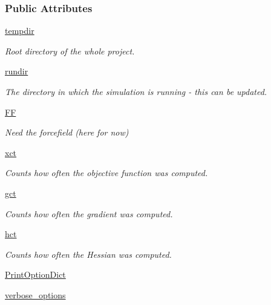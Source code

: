 \subsubsection*{\-Public \-Attributes}
\begin{DoxyCompactItemize}
\item 
\hyperlink{classforcebalance_1_1target_1_1Target_aede2856573b890cd47054ad36937d6f6}{tempdir}
\begin{DoxyCompactList}\small\item\em \-Root directory of the whole project. \end{DoxyCompactList}\item 
\hyperlink{classforcebalance_1_1target_1_1Target_a1da470037ef61c22dc44beb85cfa01a9}{rundir}
\begin{DoxyCompactList}\small\item\em \-The directory in which the simulation is running -\/ this can be updated. \end{DoxyCompactList}\item 
\hyperlink{classforcebalance_1_1target_1_1Target_a796dc30a19a60c63fb43b088d40a963f}{\-F\-F}
\begin{DoxyCompactList}\small\item\em \-Need the forcefield (here for now) \end{DoxyCompactList}\item 
\hyperlink{classforcebalance_1_1target_1_1Target_ad4cd0ab38d8fc97d3e7a6e22ce130a16}{xct}
\begin{DoxyCompactList}\small\item\em \-Counts how often the objective function was computed. \end{DoxyCompactList}\item 
\hyperlink{classforcebalance_1_1target_1_1Target_aff6e42b84dd8eb5a4dc3b47aa58bc64c}{gct}
\begin{DoxyCompactList}\small\item\em \-Counts how often the gradient was computed. \end{DoxyCompactList}\item 
\hyperlink{classforcebalance_1_1target_1_1Target_ae929918b7e695a99d7ec946d06d793e1}{hct}
\begin{DoxyCompactList}\small\item\em \-Counts how often the \-Hessian was computed. \end{DoxyCompactList}\item 
\hyperlink{classforcebalance_1_1BaseClass_afc6659278497d7245bc492ecf405ccae}{\-Print\-Option\-Dict}
\item 
\hyperlink{classforcebalance_1_1BaseClass_afd68efa29ccd2f320f4cf82198214aac}{verbose\-\_\-options}
\end{DoxyCompactItemize}


